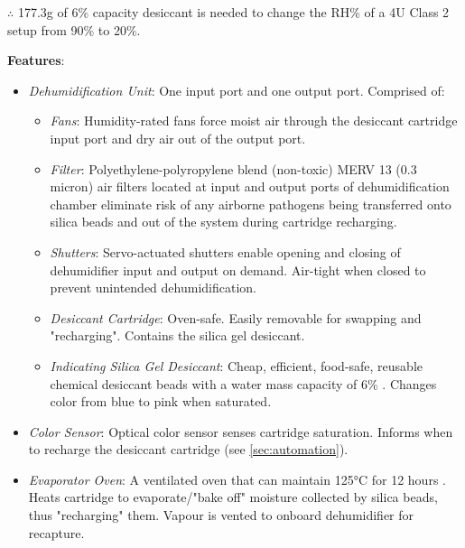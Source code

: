 $\therefore$ 177.3g of 6\% capacity desiccant is needed to change the RH\% of a 4U Class 2 setup from 90\% to 20\%.

\clearpage

\textbf{Features}:
\begin{itemize}
    \item \textit{Dehumidification Unit}: One input port and one output port. Comprised of:
    \begin{itemize}
        \item \textit{Fans}: Humidity-rated fans force moist air through the desiccant cartridge input port and dry air out of the output port.
        \item \textit{Filter}: Polyethylene-polyropylene blend (non-toxic) MERV 13 (0.3 micron) air filters \cite{filter} located at input and output ports of dehumidification chamber eliminate risk of any airborne pathogens being transferred onto silica beads and out of the system during cartridge recharging.
        \item \textit{Shutters}: Servo-actuated shutters enable opening and closing of dehumidifier input and output on demand. Air-tight when closed to prevent unintended dehumidification.
        \item \textit{Desiccant Cartridge}: Oven-safe. Easily removable for swapping and "recharging". Contains the silica gel desiccant.
        \item \textit{Indicating Silica Gel Desiccant}: Cheap, efficient, food-safe, reusable chemical desiccant beads with a water mass capacity of 6\% \cite{desiccant}. Changes color from blue to pink when saturated.
    \end{itemize}
    \item \textit{Color Sensor}: Optical color sensor \cite{colorsensor} senses cartridge saturation. Informs when to recharge the desiccant cartridge (see \ref{sec:automation}).
    \item \textit{Evaporator Oven}: A ventilated oven that can maintain 125°C for 12 hours \cite{desiccant}. Heats cartridge to evaporate/"bake off" moisture collected by silica beads, thus "recharging" them. Vapour is vented to onboard dehumidifier for recapture.
\end{itemize}